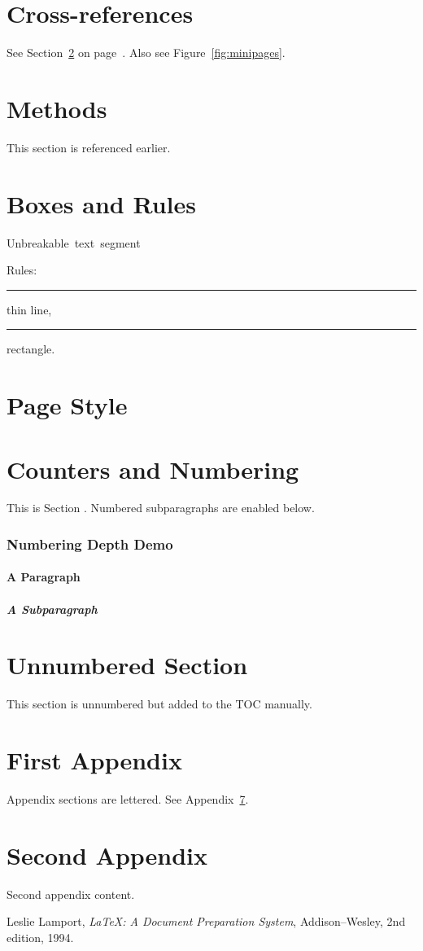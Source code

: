 \documentclass[titlepage,a4paper,12pt]{article}
\begin{document}
\section{Cross-references}
See Section~\ref{sec:methods} on page~\pageref{sec:methods}. Also see Figure~\ref{fig:minipages}.

\section{Methods}
\label{sec:methods}
This section is referenced earlier.

\section{Boxes and Rules}
 \quad {}
\par
\mbox{Unbreakable text segment} \par
{}
\par
Rules: \rule{1cm}{0.4pt} thin line, \rule{2mm}{5mm} rectangle.

\section{Page Style}
\thispagestyle{plain}
\pagestyle{plain}

\section{Counters and Numbering}
This is Section \thesection.
\setcounter{secnumdepth}{5}
\setcounter{tocdepth}{3}
Numbered subparagraphs are enabled below.
\subsubsection{Numbering Depth Demo}
\paragraph{A Paragraph}
\subparagraph{A Subparagraph}

\section*{Unnumbered Section}
This section is unnumbered but added to the TOC manually.

\appendix
\section{First Appendix}
Appendix sections are lettered. See Appendix~\ref{sec:appB}.

\section{Second Appendix}
\label{sec:appB}
Second appendix content.

\begin{thebibliography}{9}
  Leslie Lamport,
  \emph{\LaTeX: A Document Preparation System},
  Addison--Wesley, 2nd edition, 1994.
\end{thebibliography}
\end{document}
